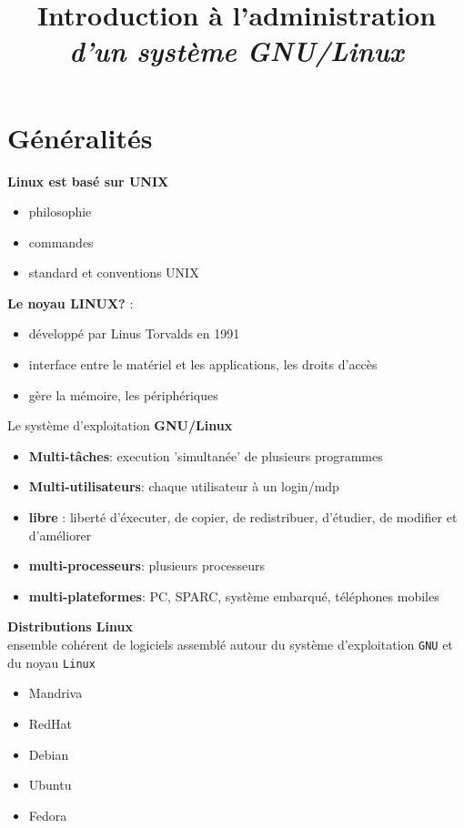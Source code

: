 \documentclass[french]{beamer}
\title{Introduction à l'administration \\ \textit{d'un système GNU/Linux}}
\author{}
\institute{Agence universitaire de la Francophonie}
\begin{document}
\begin{frame}
\titlepage
\end{frame}

\section{Généralités}
\frame{\tableofcontents[current]}

\begin{frame}
\textbf{Linux est basé sur UNIX}
    \begin{itemize}
    \item philosophie
    \item commandes
    \item standard et conventions UNIX
    \end{itemize}
\end{frame}

\begin{frame}
\textbf{Le noyau LINUX?} :
    \begin{itemize}
    \item développé par Linus Torvalds en 1991
    \item interface entre le matériel et les applications, les droits d'accès
    \item gère la mémoire, les périphériques 
    \end{itemize}
\end{frame}

\begin{frame}
Le système d'exploitation \textbf{GNU/Linux}
    \begin{itemize}
    \item \textbf{Multi-tâches}: execution 'simultanée' de plusieurs programmes
    \item \textbf{Multi-utilisateurs}: chaque utilisateur à un login/mdp
    \item \textbf{libre} : liberté d'éxecuter, de copier, de redistribuer, d'étudier, de
    modifier et d'améliorer
    \item \textbf{multi-processeurs}: plusieurs processeurs
    \item \textbf{multi-plateformes}: PC, SPARC, système embarqué, téléphones
    mobiles
    \end{itemize}
\end{frame}

\begin{frame}
\textbf{Distributions Linux} \\
ensemble cohérent de logiciels assemblé autour du système d'exploitation
\texttt{GNU} et du noyau \texttt{Linux}
    \begin{itemize}
    \item Mandriva 
    \item RedHat
    \item Debian
    \item Ubuntu
    \item Fedora
    \end{itemize}
\end{frame}
\end{document}
